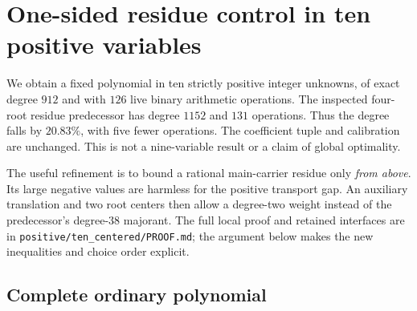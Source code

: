 \section{One-sided residue control in ten positive variables}
\label{sec:positive-ten-centered}

We obtain a fixed polynomial in ten strictly positive integer unknowns,
of exact degree $912$ and with $126$ live binary arithmetic operations.
The inspected four-root residue predecessor has degree $1152$ and $131$
operations. Thus the degree falls by $20.83\%$, with five fewer operations.
The coefficient tuple and calibration are unchanged. This is not a
nine-variable result or a claim of global optimality.

The useful refinement is to bound a rational main-carrier residue only
\emph{from above}. Its large negative values are harmless for the positive
transport gap. An auxiliary translation and two root centers then allow a
degree-two weight instead of the predecessor's degree-$38$ majorant.
The full local proof and retained interfaces are in
\texttt{positive/ten\_centered/PROOF.md}; the argument below makes the new
inequalities and choice order explicit.

\subsection{Complete ordinary polynomial}

